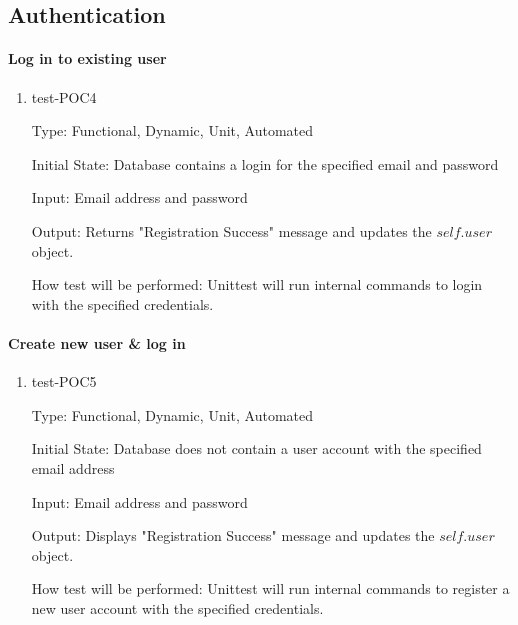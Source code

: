 \documentclass[12pt, titlepage]{article}
\begin{document}
\newpage
\subsection{Authentication}

\paragraph{Log in to existing user}
\begin{enumerate}
\item{test-POC4}

Type: Functional, Dynamic, Unit, Automated

Initial State: Database contains a login for the specified email and password
					
Input: Email address and password
					
Output: Returns "Registration Success" message and updates the $self.user$ object.
					
How test will be performed: Unittest will run internal commands to login with the specified credentials.
\end{enumerate}

\paragraph{Create new user \& log in}
\begin{enumerate}
\item{test-POC5}

Type: Functional, Dynamic, Unit, Automated

Initial State: Database does not contain a user account with the specified email address
					
Input: Email address and password
					
Output: Displays "Registration Success" message and updates the $self.user$ object.
					
How test will be performed: Unittest will run internal commands to register a new user account with the specified credentials.
\end{enumerate}
	
\end{document}
